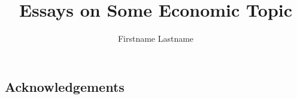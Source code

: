 \documentclass[a5paper, 8pt,american]{book}
\begin{document}
\frontmatter
\title{\huge Essays on Some Economic Topic}
\author{\Large Firstname Lastname \vspace{-0.4cm}}
\date{}
\maketitle

\begin{onehalfspace}
\setcounter{page}{0}
\chapter*{Acknowledgements}  

\end{onehalfspace}

\begin{singlespace}
    \tableofcontents
\end{singlespace}
\end{document}
